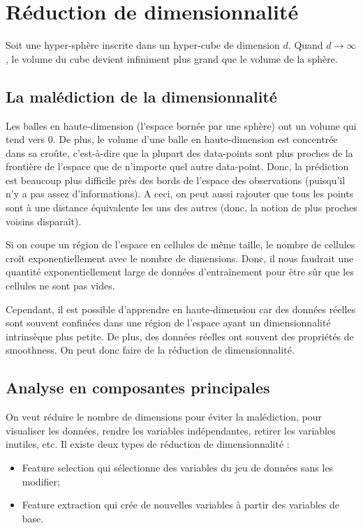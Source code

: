 \section{Réduction de dimensionnalité}
    Soit une hyper-sphère inscrite dans un hyper-cube de dimension \(d\). Quand \(d \to \infty\), le volume du cube devient infiniment plus grand que le volume de la sphère.

    \subsection{La malédiction de la dimensionnalité}
        Les balles en haute-dimension (l'espace bornée par une sphère) ont un volume qui tend vers 0. De plus, le volume d'une balle en haute-dimension est concentrée dans sa croûte, c'est-à-dire que la plupart des data-points sont plus proches de la frontière de l'espace que de n'importe quel autre data-point. Donc, la prédiction est beaucoup plus difficile près des bords de l'espace des observations (puisqu'il n'y a pas assez d'informations). A ceci, on peut aussi rajouter que tous les points sont à une distance équivalente les uns des autres (donc, la notion de plus proches voisins disparaît).

        Si on coupe un région de l'espace en cellules de même taille, le nombre de cellules croît exponentiellement avec le nombre de dimensions. Donc, il nous faudrait une quantité exponentiellement large de données d'entraînement pour être sûr que les cellules ne sont pas vides.

        Cependant, il est possible d'apprendre en haute-dimension car des données réelles sont souvent confinées dans une région de l'espace ayant un dimensionnalité intrinsèque plus petite. De plus, des données réelles ont souvent des propriétés de smoothness. On peut donc faire de la réduction de dimensionnalité.

    \subsection{Analyse en composantes principales}
        On veut réduire le nombre de dimensions pour éviter la malédiction, pour visualiser les données, rendre les variables indépendantes, retirer les variables inutiles, etc. Il existe deux types de réduction de dimensionnalité :
        \begin{itemize}
            \item Feature selection qui sélectionne des variables du jeu de données sans les modifier;
            \item Feature extraction qui crée de nouvelles variables à partir des variables de base.
        \end{itemize}

